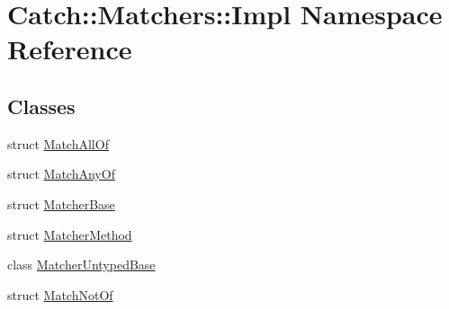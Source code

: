\hypertarget{namespace_catch_1_1_matchers_1_1_impl}{}\section{Catch\+:\+:Matchers\+:\+:Impl Namespace Reference}
\label{namespace_catch_1_1_matchers_1_1_impl}
\subsection*{Classes}
\begin{DoxyCompactItemize}
\item 
struct \mbox{\hyperlink{struct_catch_1_1_matchers_1_1_impl_1_1_match_all_of}{Match\+All\+Of}}
\item 
struct \mbox{\hyperlink{struct_catch_1_1_matchers_1_1_impl_1_1_match_any_of}{Match\+Any\+Of}}
\item 
struct \mbox{\hyperlink{struct_catch_1_1_matchers_1_1_impl_1_1_matcher_base}{Matcher\+Base}}
\item 
struct \mbox{\hyperlink{struct_catch_1_1_matchers_1_1_impl_1_1_matcher_method}{Matcher\+Method}}
\item 
class \mbox{\hyperlink{class_catch_1_1_matchers_1_1_impl_1_1_matcher_untyped_base}{Matcher\+Untyped\+Base}}
\item 
struct \mbox{\hyperlink{struct_catch_1_1_matchers_1_1_impl_1_1_match_not_of}{Match\+Not\+Of}}
\end{DoxyCompactItemize}
